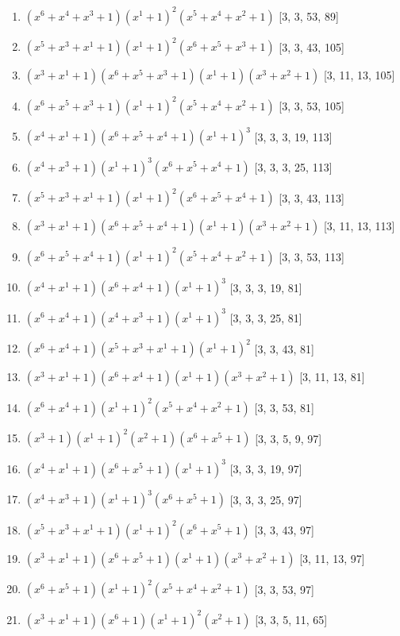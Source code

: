 \documentclass[10pt,twocolumn]{article}
\begin{document}
\begin{enumerate}
\item $(x^{6} + x^{4} + x^{3} + 1)(x^{1} + 1)^{2}(x^{5} + x^{4} + x^{2} + 1)$  [3, 3, 53, 89]
\item $(x^{5} + x^{3} + x^{1} + 1)(x^{1} + 1)^{2}(x^{6} + x^{5} + x^{3} + 1)$  [3, 3, 43, 105]
\item $(x^{3} + x^{1} + 1)(x^{6} + x^{5} + x^{3} + 1)(x^{1} + 1)(x^{3} + x^{2} + 1)$  [3, 11, 13, 105]
\item $(x^{6} + x^{5} + x^{3} + 1)(x^{1} + 1)^{2}(x^{5} + x^{4} + x^{2} + 1)$  [3, 3, 53, 105]
\item $(x^{4} + x^{1} + 1)(x^{6} + x^{5} + x^{4} + 1)(x^{1} + 1)^{3}$  [3, 3, 3, 19, 113]
\item $(x^{4} + x^{3} + 1)(x^{1} + 1)^{3}(x^{6} + x^{5} + x^{4} + 1)$  [3, 3, 3, 25, 113]
\item $(x^{5} + x^{3} + x^{1} + 1)(x^{1} + 1)^{2}(x^{6} + x^{5} + x^{4} + 1)$  [3, 3, 43, 113]
\item $(x^{3} + x^{1} + 1)(x^{6} + x^{5} + x^{4} + 1)(x^{1} + 1)(x^{3} + x^{2} + 1)$  [3, 11, 13, 113]
\item $(x^{6} + x^{5} + x^{4} + 1)(x^{1} + 1)^{2}(x^{5} + x^{4} + x^{2} + 1)$  [3, 3, 53, 113]
\item $(x^{4} + x^{1} + 1)(x^{6} + x^{4} + 1)(x^{1} + 1)^{3}$  [3, 3, 3, 19, 81]
\item $(x^{6} + x^{4} + 1)(x^{4} + x^{3} + 1)(x^{1} + 1)^{3}$  [3, 3, 3, 25, 81]
\item $(x^{6} + x^{4} + 1)(x^{5} + x^{3} + x^{1} + 1)(x^{1} + 1)^{2}$  [3, 3, 43, 81]
\item $(x^{3} + x^{1} + 1)(x^{6} + x^{4} + 1)(x^{1} + 1)(x^{3} + x^{2} + 1)$  [3, 11, 13, 81]
\item $(x^{6} + x^{4} + 1)(x^{1} + 1)^{2}(x^{5} + x^{4} + x^{2} + 1)$  [3, 3, 53, 81]
\item $(x^{3} + 1)(x^{1} + 1)^{2}(x^{2} + 1)(x^{6} + x^{5} + 1)$  [3, 3, 5, 9, 97]
\item $(x^{4} + x^{1} + 1)(x^{6} + x^{5} + 1)(x^{1} + 1)^{3}$  [3, 3, 3, 19, 97]
\item $(x^{4} + x^{3} + 1)(x^{1} + 1)^{3}(x^{6} + x^{5} + 1)$  [3, 3, 3, 25, 97]
\item $(x^{5} + x^{3} + x^{1} + 1)(x^{1} + 1)^{2}(x^{6} + x^{5} + 1)$  [3, 3, 43, 97]
\item $(x^{3} + x^{1} + 1)(x^{6} + x^{5} + 1)(x^{1} + 1)(x^{3} + x^{2} + 1)$  [3, 11, 13, 97]
\item $(x^{6} + x^{5} + 1)(x^{1} + 1)^{2}(x^{5} + x^{4} + x^{2} + 1)$  [3, 3, 53, 97]
\item $(x^{3} + x^{1} + 1)(x^{6} + 1)(x^{1} + 1)^{2}(x^{2} + 1)$  [3, 3, 5, 11, 65]

\end{enumerate}
\end{document}
